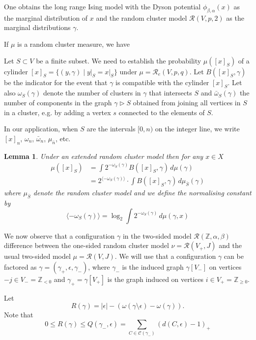 \documentclass[11pt, a4paper]{amsart}
\newtheorem{lem}[thm]{Lemma}
\theoremstyle{definition}
\theoremstyle{remark}
\renewcommand{\d}{\,d}
\providecommand{\ZZ}{\mathbb{Z}}
\providecommand{\mscr}{\mathscr}
\providecommand{\e}{\epsilon}
\providecommand{\g}{\gamma}
\providecommand{\w}{\omega}
\def\X{X}
\begin{document}
One obtains the long range Ising model with the Dyson potential $\phi_{\beta,\alpha}(x)$ as
the marginal distribution of $x$ and the random cluster model $\mscr R(V,p,2)$
as the marginal distributions $\g$.

If $\mu$ is a random cluster measure, we have 

\def\cc#1{{\langle #1 \rangle}}

Let $S\subset V$ be a finite subset.
We need to establish the probability $\mu([x]_S)$ of a cylinder 
$[x]_S=\{(y,\g) \mid y\vert_S = x\vert_S\}$ under $\mu=\mscr R_e(V,p,q)$.
Let $B([x]_S,\g)$ be the indicator for the event that $\g$ is compatible with 
the cylinder $[x]_S$. Let also $\w_S(\g)$ denote the number of clusters in $\gamma$ that intersects $S$ and $\bar\w_S(\g)$ the number of components in the graph $\g\triangleright S$
obtained from joining all 
vertices in $S$ in a cluster, e.g. by adding a vertex $s$ connected to the elements of $S$.

In our application, when $S$ are the intervals $[0,n)$ on the integer line,
we write $[x]_n$, $\w_n$, $\bar\w_n$, $\mu_{\bar n}$, etc. 

\begin{lem}\label{probcyl}
  Under an extended random cluster model then for any $x\in\X$
\begin{align}
    \mu([x]_S) &=  \int 2^{-\w_S(\g)} B([x]_S,\g) \d\mu(\g) \\
    &= 2^\cc{-\w_S(\g)} \cdot \int B([x]_S,\g) \d \mu_{\bar S}(\g)  
\end{align}
where $\mu_{\bar S}$ denote the random cluster model and we define the normalising
constant by
$$ \cc{-\w_S(\g)} = \log_2 \int 2^{-\w_S(\g)} \d\mu(\g,x) $$
\end{lem}


We now observe that a configuration $\g$ in the two-sided model
$\mscr R(\ZZ,\alpha,\beta)$ difference between the one-sided random cluster model
$\nu = \mscr R(V_+,J)$ and the usual two-sided model $\mu = \mscr R(V,J)$. We will
use that a configuration $\g$ can be factored as $\g = (\g_+, \e, \g_-)$, where
$\g_-$ is the induced graph $\g[V_-]$ on vertices $-j\in V_-=\ZZ_{<0}$ and
$\g_+=\g[V_+]$ is the graph induced on vertices $i\in V_+=\ZZ_{\ge0}$.

Let
$$ R(\g)=|\epsilon|-(\omega(\g \setminus \epsilon)-\omega(\g)).$$
Note that
\begin{equation}
0\le R(\g) \le Q(\g_-,\e) =\sum_{C\in\mscr C(\g_-)} \left(d(C,\epsilon)-1\right)_+
\end{equation}
\end{document}

